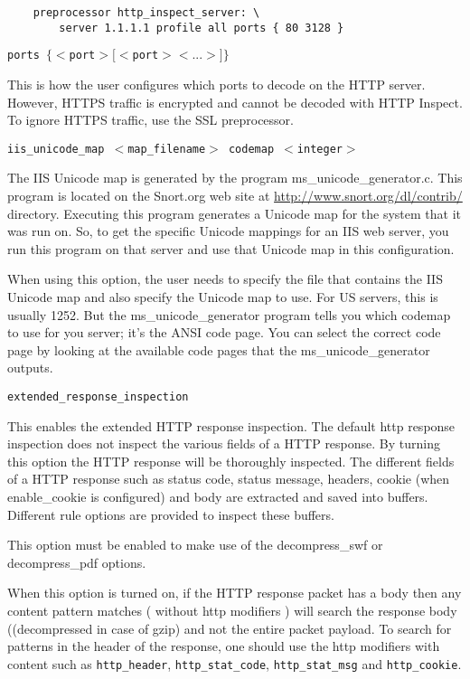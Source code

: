 \documentclass[english]{report}
\newcounter{slistnum}
\newenvironment{slist}
{ \begin{list}{ {\bf \arabic{slistnum}.} }{\usecounter{slistnum} } }
{ \end{list} }
\newenvironment{note}{
\samepage
    \vspace{10pt}{\textsf{
        {\hspace{7pt}\Huge{$\triangle$\hspace{-12.5pt}{\Large{$^!$}}}}\hspace{5pt}
        {\Large{NOTE}}
    }
    }
   \begin{center}
    \par\vspace{-17pt}

    \begin{lrbox}{\savepar}
    \begin{minipage}[r]{6in}
}
{
    \end{minipage}
    \end{lrbox}
    \fbox{
        \usebox{
            \savepar
	}
    }
    \par\vskip10pt
    \end{center}
}
\newenvironment{note}{
        \begin{rawhtml}
        <p><table border="1"><tr><td><b>
        Note:&nbsp;&nbsp;</b>
        \end{rawhtml}
}{
        \begin{rawhtml}
        </b></td></tr></table></p>
        \end{rawhtml}
}
\begin{document}
\begin{slist}
\begin{verbatim}
    preprocessor http_inspect_server: \
        server 1.1.1.1 profile all ports { 80 3128 }
\end{verbatim}
                             
\item \texttt{ports $\{ <$port$> [<$port$> <...>] \}$}

This is how the user configures which ports to decode on the HTTP server.
However, HTTPS traffic is encrypted and cannot be decoded with HTTP Inspect.
To ignore HTTPS traffic, use the SSL preprocessor.

\item \texttt{iis\_unicode\_map $<$map\_filename$>$ codemap $<$integer$>$}

The IIS Unicode map is generated by the program ms\_unicode\_generator.c.  This
program is located on the Snort.org web site at
\url{http://www.snort.org/dl/contrib/} directory.  Executing this program
generates a Unicode map for the system that it was run on.  So, to get the
specific Unicode mappings for an IIS web server, you run this program on that
server and use that Unicode map in this configuration.

When using this option, the user needs to specify the file that contains the
IIS Unicode map and also specify the Unicode map to use.  For US servers, this
is usually 1252.  But the ms\_unicode\_generator program tells you which
codemap to use for you server; it's the ANSI code page.  You can select the
correct code page by looking at the available code pages that the
ms\_unicode\_generator outputs.

\item \texttt{extended\_response\_inspection}

This enables the extended HTTP response inspection. The default http response
inspection does not inspect the various fields of a HTTP response. By turning
this option the HTTP response will be thoroughly inspected. The different fields
of a HTTP response such as status code, status message, headers, cookie (when
enable\_cookie is configured) and body are extracted and saved into buffers.
Different rule options are provided to inspect these buffers.

This option must be enabled to make use of the decompress\_swf or decompress\_pdf
options.

\begin{note}

When this option is turned on, if the HTTP response packet has a body then any
content pattern matches ( without http modifiers ) will search the response body
((decompressed in case of gzip) and not the entire packet payload. To search for 
patterns in the header of the response, one should use the http modifiers with 
content such as \texttt{http\_header}, \texttt{http\_stat\_code}, \texttt{http\_stat\_msg} 
and \texttt{http\_cookie}.


\end{note}
\end{slist}
\end{document}
